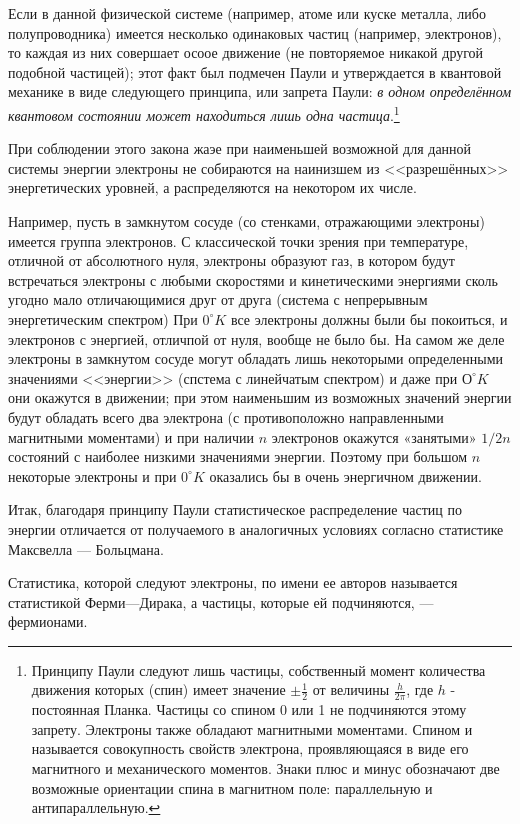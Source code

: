 \documentclass[a4paper,10pt]{book}
\begin{document}
Если в данной физической системе (например, атоме или куске металла, либо полупроводника) имеется несколько одинаковых частиц (например, электронов),
то каждая из них совершает осоое движение (не повторяемое никакой другой подобной частицей); этот факт был подмечен Паули и утверждается в 
квантовой механике в виде следующего принципа, или запрета Паули: \emph{в одном определённом квантовом состоянии может находиться лишь одна частица}.\footnote{Принципу Паули следуют лишь частицы, собственный момент количества движения которых (спин) имеет значение $\pm\frac{1}{2}$ от величины $\frac{h}{2\pi}$, где $h$ - постоянная Планка. Частицы со спином 0 или 1 не подчиняются этому запрету.
Электроны также обладают магнитными моментами. Спином и называется совокупность свойств электрона, проявляющаяся в виде его магнитного и механического
моментов. Знаки плюс и минус обозначают две возможные ориентации спина в магнитном поле: параллельную и антипараллельную.}

При соблюдении этого закона жаэе при наименьшей возможной для данной системы энергии электроны не собираются на наинизшем из <<разрешённых>>
энергетических уровней, а распределяются на некотором их числе.

Например, пусть в замкнутом сосуде (со стенками, отражающими электроны) имеется группа электронов. С классической точки зрения при температуре, отличной от абсолютного нуля, 
электроны образуют газ, в котором будут встречаться электроны с любыми скоростями и кинетическими энергиями сколь угодно мало отличающимися друг от друга (система с непрерывным энергетическим спектром) При $0^\circ K$ все электроны должны были бы покоиться, и электронов с энергией, отличпой от нуля, вообще не было бы. На самом же деле электроны в замкнутом сосуде могут обладать лишь некоторыми определенными значениями <<энергии>> (спстема с линейчатым спектром) и даже при $О^\circ K$ они окажутся в движении; при этом наименьшим из возможных значений энергии будут обладать всего два электрона (с противоположно направленными магнитными моментами) и при наличии $n$ электронов окажутся «занятыми» $1/2 n$ состояний с наиболее низкими значениями энергии. Поэтому при большом $n$ некоторые электроны и при $0^\circ K$ оказались бы в очень энергичном движении.

Итак, благодаря принципу Паули статистическое распределение частиц по энергии отличается от получаемого в аналогичных условиях согласно статистике Максвелла — Больцмана. 

Статистика, которой следуют электроны, по имени ее авторов называется статистикой Ферми—Дирака, а частицы, которые ей подчиняются, — фермионами. 
\end{document}
